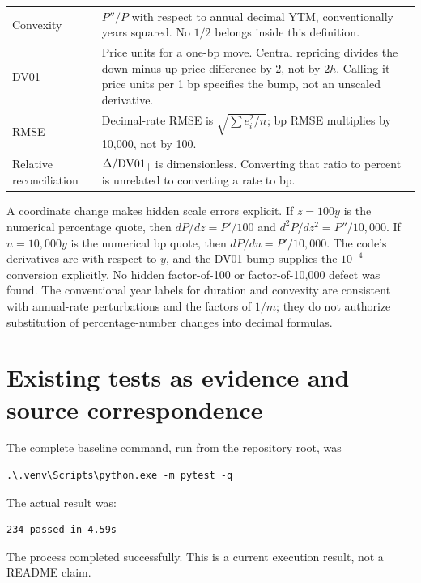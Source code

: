 \documentclass[12pt,a4paper]{article}
\begin{document}
\begin{longtable}{@{}p{}p{}@{}}
Convexity & $P''/P$ with respect to annual decimal YTM, conventionally years squared. No $1/2$ belongs inside this definition.\\
DV01 & Price units for a one-bp move. Central repricing divides the down-minus-up price difference by 2, not by $2h$. Calling it price units per 1 bp specifies the bump, not an unscaled derivative.\\
RMSE & Decimal-rate RMSE is $\sqrt{\sum e_i^2/n}$; bp RMSE multiplies by 10,000, not by 100.\\
Relative reconciliation & $\Delta/{\rm DV01}_{\parallel}$ is dimensionless. Converting that ratio to percent is unrelated to converting a rate to bp.\\
\bottomrule
\end{longtable}
\normalsize
A coordinate change makes hidden scale errors explicit. If $z=100y$ is
the numerical percentage quote, then $dP/dz=P'/100$ and
$d^2P/dz^2=P''/10{,}000$. If $u=10{,}000y$ is the numerical bp quote,
then $dP/du=P'/10{,}000$. The code's derivatives are with respect to
$y$, and the DV01 bump supplies the $10^{-4}$ conversion explicitly.
No hidden factor-of-100 or factor-of-10,000 defect was found.
The conventional year labels for duration and convexity are consistent
with annual-rate perturbations and the factors of $1/m$; they do not
authorize substitution of percentage-number changes into decimal formulas.

\section{Existing tests as evidence and source correspondence}
The complete baseline command, run from the repository root, was
\begin{verbatim}
.\.venv\Scripts\python.exe -m pytest -q
\end{verbatim}
The actual result was:
\begin{verbatim}
234 passed in 4.59s
\end{verbatim}
The process completed successfully. This is a current execution result,
not a README claim.
\end{document}
